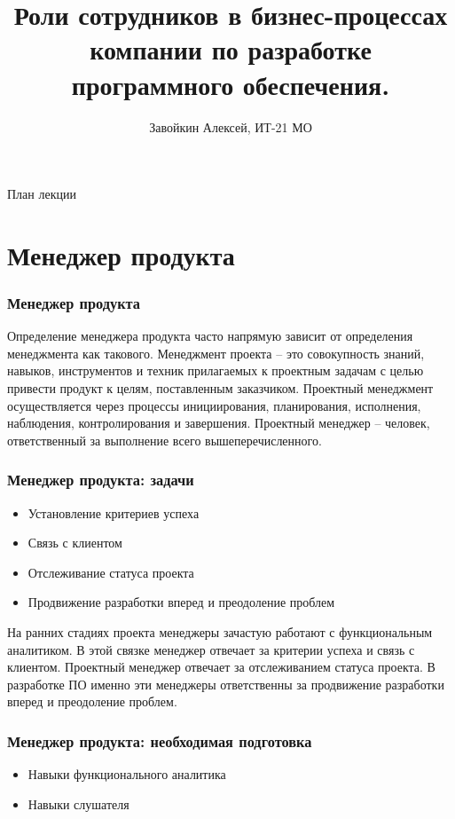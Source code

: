 \documentclass{../industrial-development}
\title{Роли сотрудников в бизнес-процессах компании по разработке программного обеспечения.}
\author{Завойкин Алексей, ИТ-21 МО}
\date{}
\begin{document}
\begin{frame}
  \titlepage
\end{frame}

\begin{frame}{План лекции}
  \tableofcontents
\end{frame}

\section{Менеджер продукта }

\begin{frame} \frametitle{Менеджер продукта }
  
\end{frame}

\lecturenotes

Определение менеджера продукта часто напрямую зависит от определения менеджмента как такового. Менеджмент проекта – это совокупность знаний, навыков, инструментов и техник прилагаемых к проектным задачам с целью привести продукт к целям, поставленным заказчиком. Проектный менеджмент осуществляется через процессы инициирования, планирования, исполнения, наблюдения, контролирования и завершения. Проектный менеджер – человек, ответственный за выполнение всего вышеперечисленного. 
  ~\cite{Anatomy}
	
\begin{frame} \frametitle{Менеджер продукта: задачи}
  \begin{itemize}
	\item Установление критериев успеха
	\item Связь с клиентом
	\item Отслеживание статуса проекта
	\item Продвижение разработки вперед и преодоление проблем 
	\end{itemize}
\end{frame}

\lecturenotes

На ранних стадиях проекта менеджеры зачастую работают с функциональным аналитиком. В этой связке менеджер отвечает за критерии успеха и связь с клиентом. 
Проектный менеджер отвечает за отслеживанием статуса проекта. В разработке ПО именно эти менеджеры ответственны за продвижение разработки вперед и преодоление проблем. 
  ~\cite{Anatomy}

\begin{frame} \frametitle{Менеджер продукта: необходимая подготовка}
  \begin{itemize}
	\item Навыки функционального аналитика
	\item Навыки слушателя
	\end{itemize}
\end{frame}
\end{document}
